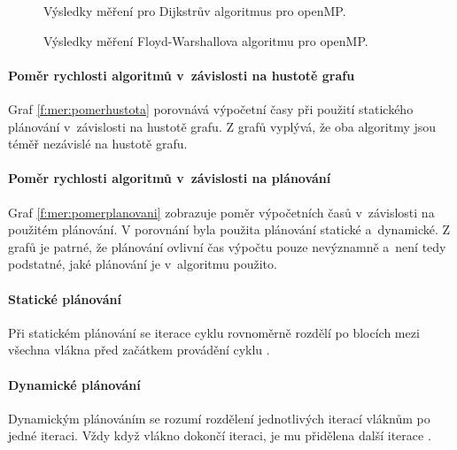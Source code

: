 \begin{figure}
    \centering
    \caption{Výsledky měření pro Dijkstrův algoritmus pro openMP.}
    \label{f:omp:vysledky:dijkstra}
\end{figure}

\begin{figure}
    \centering
    \caption{Výsledky měření Floyd-Warshallova algoritmu pro openMP.}
    \label{f:omp:vysledky:fw}
\end{figure}

\paragraph{Poměr rychlosti algoritmů v~závislosti na hustotě grafu}
Graf \ref{f:mer:pomerhustota} porovnává výpočetní časy při použití statického plánování v~závislosti na hustotě grafu. Z grafů vyplývá, že oba algoritmy jsou téměř nezávislé na hustotě grafu.

\paragraph{Poměr rychlosti algoritmů v~závislosti na plánování}
Graf \ref{f:mer:pomerplanovani} zobrazuje poměr výpočetních časů v~závislosti na použitém plánování.
V po\-rov\-ná\-ní byla použita plánování statické a~dynamické. Z grafů je patrné, že plánování ovlivní čas výpočtu pouze nevýznamně a~není tedy podstatné, jaké plánování je v~algoritmu použito. 

\paragraph{Statické plánování}
Při statickém plánování se iterace cyklu rovnoměrně rozdělí po blocích mezi všechna vlákna před začátkem provádění cyklu \cite{w:omp}.

\paragraph{Dynamické plánování}
Dynamickým plánováním se rozumí rozdělení jednotlivých iterací vláknům po jedné iteraci. Vždy když vlákno dokončí iteraci, je mu přidělena další iterace \cite{w:omp}.

